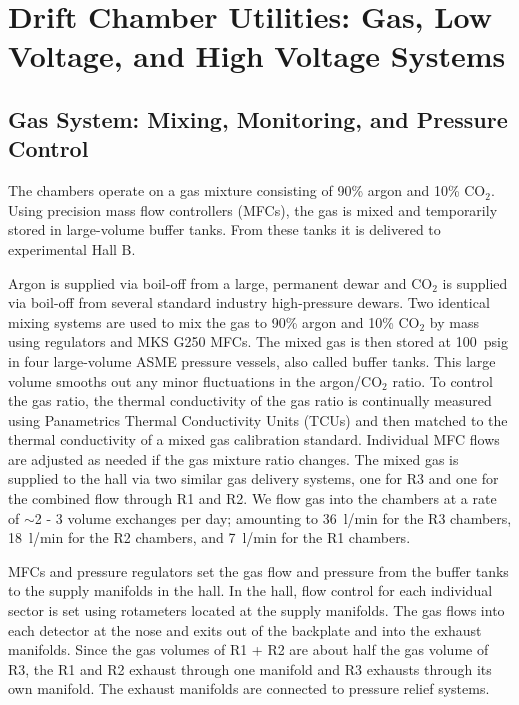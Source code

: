 \section{Drift Chamber Utilities: Gas, Low Voltage, and High Voltage Systems}
\label{utilities}

\subsection{Gas System: Mixing, Monitoring, and Pressure Control}

The chambers operate on a gas mixture consisting of 90\% argon and 10\% CO$_2$.
Using precision mass flow controllers (MFCs), the gas is mixed and temporarily
stored in large-volume buffer tanks.  From these tanks it is delivered
to experimental Hall B.  

Argon is supplied via boil-off from a large, permanent dewar and CO$_2$ is supplied 
via boil-off from several standard industry high-pressure dewars. Two identical mixing
systems are used to mix the gas to 90\% argon and 10\% CO$_2$ by mass using regulators and MKS G250 
MFCs. The mixed gas is then stored at 100~psig in four large-volume 
ASME pressure vessels, also called buffer tanks. This large volume smooths out 
any minor fluctuations in the argon/CO$_2$ ratio. To control the gas ratio, the thermal 
conductivity of the gas ratio is continually measured using Panametrics Thermal 
Conductivity Units (TCUs) and then matched to the thermal conductivity of a mixed 
gas calibration standard. Individual MFC flows are adjusted as needed if the gas mixture
ratio changes. The mixed gas is supplied to the hall via two similar gas delivery systems, 
one for R3 and one for the combined flow through R1 and R2. 
We flow gas into the chambers at a rate of $\sim$2 - 3 volume exchanges per day;
amounting to 36~l/min for the R3 chambers, 18~l/min for the R2 chambers, and 7~l/min
for the R1 chambers.

MFCs and pressure regulators set the gas flow and pressure from the 
buffer tanks to the supply manifolds in the hall. In the hall, flow control for each 
individual sector is set using rotameters located at the supply manifolds. The gas flows 
into each detector at the nose and exits out of the backplate and into the exhaust 
manifolds. Since the gas volumes of R1 + R2 are about half the gas volume of R3, the R1 and R2 exhaust 
through one manifold and R3 exhausts through its own manifold. The exhaust manifolds 
are connected to pressure relief systems. 

